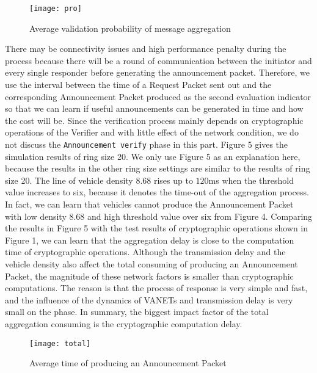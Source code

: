 \documentclass[a4paper]{article}
\begin{document}
\begin{figure}
  \centering
  \texttt{[image: pro]}
  \caption{Average validation probability of message aggregation}
\end{figure}

There may be connectivity issues and high performance penalty during the process because there will be a round of communication between the initiator and every single responder before generating the announcement packet. Therefore, we use the interval between the time of a Request Packet sent out and the corresponding Announcement Packet produced as the second evaluation indicator so that we can learn if useful announcements can be generated in time and how the cost will be. Since the verification process mainly depends on cryptographic operations of the Verifier and with little effect of the network condition, we do not discuss the \texttt{Announcement verify} phase in this part. Figure 5 gives the simulation results of ring size 20. We only use Figure 5 as an explanation here, because the results in the other ring size settings are similar to the results of ring size 20. The line of vehicle density 8.68 rises up to $120$ms when the threshold value increases to six, because it denotes the time-out of the aggregation process. In fact, we can learn that vehicles cannot produce the Announcement Packet with low density 8.68 and high threshold value over six from Figure 4. Comparing the results in Figure 5 with the test results of cryptographic operations shown in Figure 1, we can learn that the aggregation delay is close to the computation time of cryptographic operations. Although the transmission delay and the vehicle density also affect the total consuming of producing an Announcement Packet, the magnitude of these network factors is smaller than cryptographic computations. The reason is that the process of response is very simple and fast, and the influence of the dynamics of VANETs and transmission delay is very small on the phase. In summary, the biggest impact factor of the total aggregation consuming is the cryptographic computation delay.

\begin{figure}
  \centering
  \texttt{[image: total]}
  \caption{Average time of producing an Announcement Packet}
\end{figure}
\end{document}
